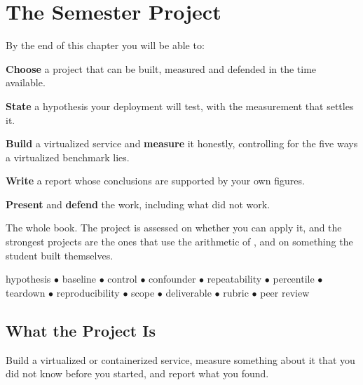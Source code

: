 \chapter{The Semester Project}\label{ch:project}

\begin{outcomes}
By the end of this chapter you will be able to:
\begin{tight}
  \item \textbf{Choose} a project that can be built, measured and defended in
        the time available.
  \item \textbf{State} a hypothesis your deployment will test, with the
        measurement that settles it.
  \item \textbf{Build} a virtualized service and \textbf{measure} it honestly,
        controlling for the five ways a virtualized benchmark lies.
  \item \textbf{Write} a report whose conclusions are supported by your own
        figures.
  \item \textbf{Present} and \textbf{defend} the work, including what did not
        work.
\end{tight}
\end{outcomes}

\begin{prereq}
The whole book. The project is assessed on whether you can apply it, and the
strongest projects are the ones that use the arithmetic of ,
 and  on something the student built
themselves.
\end{prereq}

\begin{keyterms}
hypothesis $\bullet$ baseline $\bullet$ control $\bullet$ confounder $\bullet$
repeatability $\bullet$ percentile $\bullet$ teardown $\bullet$ reproducibility
$\bullet$ scope $\bullet$ deliverable $\bullet$ rubric $\bullet$ peer review
\end{keyterms}

\section{What the Project Is}

Build a virtualized or containerized service, measure something about it that
you did not know before you started, and report what you found.

